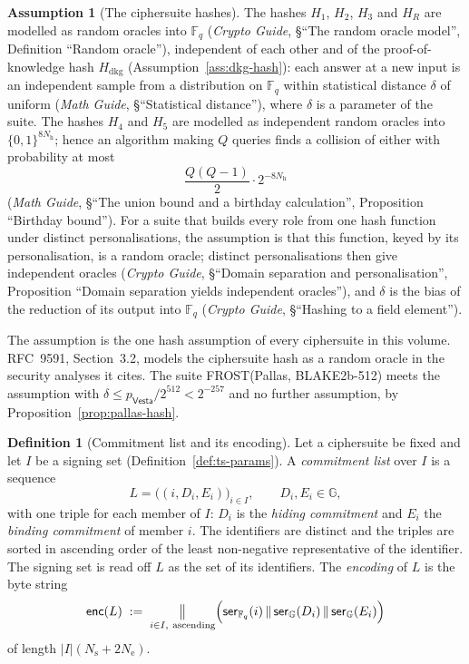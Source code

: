 \documentclass[11pt,a4paper]{article}
\theoremstyle{definition}
\newtheorem{definition}[theorem]{Definition}
\newtheorem{assumption}[theorem]{Assumption}
\newcommand{\F}{\mathbb{F}}
\newcommand{\G}{\mathbb{G}}
\newcommand{\Fq}{\F_q}
\newcommand{\Vesta}{\ensuremath{\mathsf{Vesta}}}
\begin{document}
\begin{assumption}[The ciphersuite hashes]\label{ass:suite-hash}
The hashes \(H_1\), \(H_2\), \(H_3\) and \(H_R\) are modelled as random
oracles into \(\Fq\) (\emph{Crypto Guide}, \S``The random oracle model'',
Definition ``Random oracle''), independent of each other and of the
proof-of-knowledge hash \(H_{\mathrm{dkg}}\)
(Assumption~\ref{ass:dkg-hash}): each answer at a new input is an
independent sample from a distribution on \(\Fq\) within statistical
distance \(\delta\) of uniform (\emph{Math Guide}, \S``Statistical
distance''), where \(\delta\) is a parameter of the suite. The hashes
\(H_4\) and \(H_5\) are modelled as independent random oracles into
\(\{0,1\}^{8 N_{\mathrm{h}}}\); hence an algorithm making \(Q\) queries
finds a collision of either with probability at most
\[
  \frac{Q (Q - 1)}{2} \cdot 2^{-8 N_{\mathrm{h}}}
\]
(\emph{Math Guide}, \S``The union bound and a birthday calculation'',
Proposition ``Birthday bound''). For a suite that builds every role from
one hash function under distinct personalisations, the assumption is that
this function, keyed by its personalisation, is a random oracle; distinct
personalisations then give independent oracles (\emph{Crypto Guide},
\S``Domain separation and personalisation'', Proposition ``Domain
separation yields independent oracles''), and \(\delta\) is the bias of the
reduction of its output into \(\Fq\) (\emph{Crypto Guide}, \S``Hashing to a
field element'').
\end{assumption}

The assumption is the one hash assumption of every ciphersuite in this
volume. RFC~9591, Section~3.2, models the ciphersuite hash as a random
oracle in the security analyses it cites. The suite
FROST(Pallas, BLAKE2b-512) meets the assumption with
\(\delta \le p_{\Vesta} / 2^{512} < 2^{-257}\) and no further assumption,
by Proposition~\ref{prop:pallas-hash}.

\begin{definition}[Commitment list and its encoding]\label{def:commit-list}
Let a ciphersuite be fixed and let \(I\) be a signing set
(Definition~\ref{def:ts-params}). A \emph{commitment list} over \(I\) is a
sequence
\[
  L = \bigl((i, D_i, E_i)\bigr)_{i \in I} ,
  \qquad D_i, E_i \in \G ,
\]
with one triple for each member of \(I\): \(D_i\) is the \emph{hiding
commitment} and \(E_i\) the \emph{binding commitment} of member \(i\). The
identifiers are distinct and the triples are sorted in ascending order of
the least non-negative representative of the identifier. The signing set
is read off \(L\) as the set of its identifiers. The \emph{encoding} of
\(L\) is the byte string
\[
  \mathsf{enc}(L) \;:=\; \mathop{\big\|}_{i \in I,\ \text{ascending}}
  \Bigl( \mathsf{ser}_{\Fq}(i) \,\|\, \mathsf{ser}_{\G}(D_i) \,\|\,
  \mathsf{ser}_{\G}(E_i) \Bigr)
\]
of length \(\lvert I \rvert (N_{\mathrm{s}} + 2 N_{\mathrm{e}})\).
\end{definition}
\end{document}
